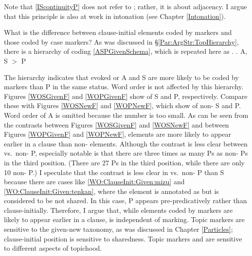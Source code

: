 Note that \ref{IScontinuityP} does not refer to ;
rather, it is about adjacency.
I argue that this principle is also at work in intonation (see Chapter \ref{Intonation}).

What is the difference between clause-initial elements coded by  markers and those coded by case markers?
As was discussed in \S \ref{Par:ArgStr:TopHierarchy},
there is a hierarchy of  coding \ref{ASPGivenSchema},
which is repeated here as \Next.
%
\ex.
 A, S $>$ P

The hierarchy indicates that
evoked or  A and S are more likely to be coded by  markers than P in the same status.
Word order is not affected by this hierarchy.
Figures \ref{WOSGivenF} and \ref{WOPGivenF} show  of
 S and P, respectively.
Compare these with Figures \ref{WOSNewF} and \ref{WOPNewF},
which show  of non- S and P.
Word order of A is omitted because the number is too small.
As can be seen from the contrasts between Figures \ref{WOSGivenF} and \ref{WOSNewF} and between Figures \ref{WOPGivenF} and \ref{WOPNewF},
 elements are more likely to appear earlier in a clause than non- elements.
Although the contrast is less clear between  vs.~non- P,
especially notable is that there are three times as many  Ps as non- Ps in the third position.
(There are 27  Ps in the third position,
while there are only 10 non- P.)
I speculate that the contrast is less clear in  vs.~non- P than S because there are cases like \ref{WO:ClauseInit:Given:mizu} and \ref{WO:ClauseInit:Given:tenkan},
where the element is annotated as  but is considered to be not shared.
In this case, P appears pre-predicatively rather than clause-initially.
Therefore, I argue that,
while elements coded by  markers are likely to appear earlier in a clause,
 is independent of  marking.
Topic markers are sensitive to the given-new taxonomy, as was discussed in Chapter \ref{Particles};
clause-initial position is sensitive to sharedness.
Topic markers and  are sensitive to different aspects of topichood.

